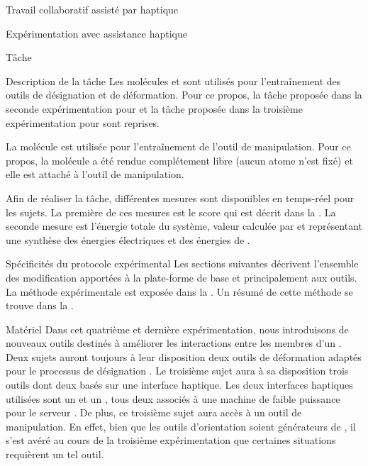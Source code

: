 \documentclass[myfrancais]{mythesis}
\begin{document}
\begin{mychapter}{Travail collaboratif assisté par haptique}
\begin{mysection}{Expérimentation avec assistance haptique}
\begin{mysubsection}{Tâche}
\begin{mysubsubsection}{Description de la tâche}
					Les molécules \myTRPCAGE et \myPrion sont utilisés pour l'entraînement des outils de désignation et de déformation.
					Pour ce propos, la tâche proposée dans la seconde expérimentation pour \myTRPCAGE et la tâche proposée dans la troisième expérimentation pour \myPrion sont reprises.

					La molécule \myTRPZIPPER est utilisée pour l'entraînement de l'outil de manipulation.
					Pour ce propos, la molécule \myTRPZIPPER a été rendue complétement libre (aucun atome n'est fixé) et elle est attaché à l'outil de manipulation.

					Afin de réaliser la tâche, différentes mesures sont disponibles en temps-réel pour les sujets.
					La première de ces mesures est le score  qui est décrit dans la .
					La seconde mesure est l'énergie totale du système, valeur calculée par  et représentant une synthèse des énergies électriques et des énergies de .
				\end{mysubsubsection}
			\end{mysubsection}
			\begin{mysubsection}{Spécificités du protocole expérimental}
				Les sections suivantes décrivent l'ensemble des modification apportées à la plate-forme de base  et principalement aux outils.
				La méthode expérimentale est exposée dans la .
				Un résumé de cette méthode se trouve dans la .
				\begin{mysubsubsection}[sss-exp4-Materiel]{Matériel}
					Dans cet quatrième et dernière expérimentation, nous introduisons de nouveaux outils destinés à améliorer les interactions entre les membres d'un .
					Deux sujets auront toujours à leur disposition deux outils de déformation adaptés pour le processus de désignation .
					Le troisième sujet aura à sa disposition trois outils dont deux basés sur une interface haptique.
					Les deux interfaces haptiques utilisées sont un \myOmni et un \myDesktop, tous deux associés à une machine de faible puissance pour le serveur .
					De plus, ce troisième sujet aura accès à un outil de manipulation.
					En effet, bien que les outils d'orientation soient générateurs de , il s'est avéré au cours de la troisième expérimentation que certaines situations requièrent un tel outil.

\end{mysubsubsection}
\end{mysubsection}
\end{mysection}
\end{mychapter}
\end{document}
